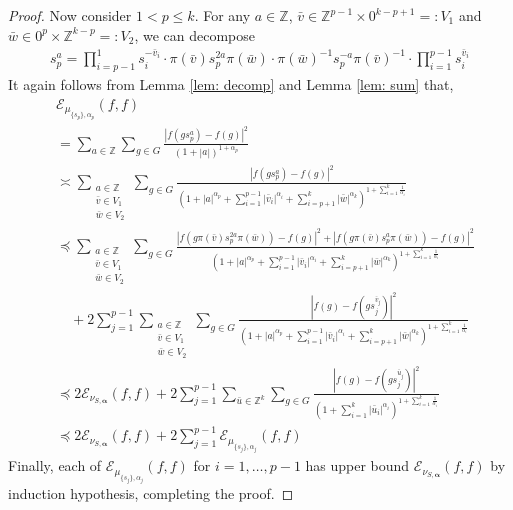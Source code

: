 \documentclass[pdflatex,sn-mathphys-num]{sn-jnl}%
\theoremstyle{thmstyleone}%
\theoremstyle{thmstyletwo}%
\theoremstyle{thmstylethree}%
\begin{document}
\begin{proof}
Now consider $1 < p \le k$. For any $a\in \mathbb{Z}$, 
$\bar{v} \in \mathbb{Z}^{p-1} \times 0^{k-p+1} =: V_1$ and $\bar{w} \in  0^{p} \times \mathbb{Z}^{k-p}=: V_2$, we can decompose 
\begin{align*}
    s_p^{a} = 
   \prod_{i=p-1}^{1} s_i^{-\bar{v}_i}\cdot 
    \pi(\bar{v}) s_p^{2a}   \pi(\bar{w}) \cdot  \pi(\bar{w})^{-1}s_p^{-a}  \pi(\bar{v})^{-1}\cdot  \prod_{i=1}^{p-1} s_i^{\bar{v}_i} 
\end{align*}
It again follows from Lemma \ref{lem: decomp} and Lemma \ref{lem: sum} that, 
\begin{align*}
    & \mathcal{E}_{\mu_{\{s_p\},\alpha_p}}(f,f)  \\
    & = \sum_{a\in \mathbb{Z}} \sum_{g\in G}   \frac{|f(gs_p^{a}) - f(g)|^2}{(1+ |a|)^{1+\alpha_p}} \\
 & \asymp  \sum_{\substack{ a \in \mathbb{Z}\\\bar{v} \in V_1\\ \bar{w} \in V_2} } \sum_{g\in G}    
\frac{|f(gs_p^{a}) - f(g)|^2 }{ (1+ |a|^{\alpha_p} + 
\sum_{i=1}^{p-1} |\bar{v}_i|^{\alpha_i} + \sum_{i=p+1}^k |\bar{w}|^{\alpha_k})^{1 + \sum_{i=1}^k \frac{1}{\alpha_i}}}\\
&\preccurlyeq    \sum_{\substack{ a \in \mathbb{Z}\\\bar{v} \in V_1\\ \bar{w} \in V_2} }  \sum_{g\in G}    \frac{ | f(g  \pi(\bar{v}) s_p^{2a}   \pi(\bar{w}))- f(g )|^2 + |f(g \pi(\bar{v}) s_p^{a}   \pi(\bar{w})) - f(g) |^2}{ (1+ |a|^{\alpha_p} + 
\sum_{i=1}^{p-1} |\bar{v}_i|^{\alpha_i} + \sum_{i=p+1}^k |\bar{w}|^{\alpha_k})^{1 + \sum_{i=1}^k \frac{1}{\alpha_i}}}  \\
 &\quad +  2 \sum_{j=1}^{p-1} \sum_{\substack{ a \in \mathbb{Z}\\\bar{v} \in V_1\\ \bar{w} \in V_2} }  \sum_{g\in G}    \frac{  |f(g) - f(gs_j^{\bar{v}_j})|^2 }{ (1+ |a|^{\alpha_p} + 
\sum_{i=1}^{p-1} |\bar{v}_i|^{\alpha_i} + \sum_{i=p+1}^k |\bar{w}|^{\alpha_k})^{1 + \sum_{i=1}^k \frac{1}{\alpha_i}}} \\
 & 
 \preccurlyeq 
2 \mathcal{E}_{\nu_{S,\bm{\alpha}}}(f,f) + 
  2 \sum_{j=1}^{p-1} \sum_{\bar{u}\in \mathbb{Z}^k }  \sum_{g\in G}    \frac{  |f(g) - f(gs_j^{\bar{u}_j})|^2 }{(1+  
  \sum_{i=1}^k
  |\bar{u}_i|^{\alpha_i})^{1 + \sum_{i=1}^k \frac{1}{\alpha_i}}}\\
  & \preccurlyeq 2\mathcal{E}_{\nu_{S,\bm{\alpha}}}(f,f) + 2\sum_{j=1}^{p-1} \mathcal{E}_{\mu_{\{s_j\},\alpha_j}}(f,f) 
     \end{align*}
     Finally, each of $\mathcal{E}_{\mu_{\{s_j\},\alpha_j}}(f,f) $ for $i=1,\ldots, p-1$ has upper bound $ \mathcal{E}_{\nu_{S,\bm{\alpha}}}(f,f) $ by induction hypothesis, completing the proof. 
\end{proof}
\end{document}
